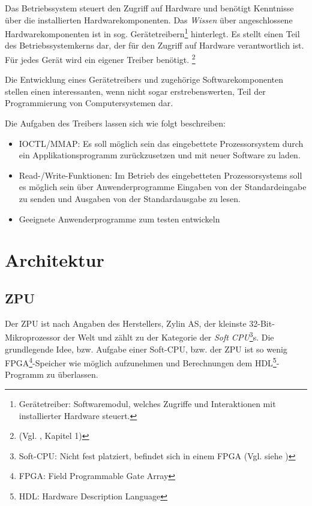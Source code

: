 \documentclass[11pt]{scrartcl}
\begin{document}
Das Betriebssystem steuert den Zugriff auf Hardware und benötigt Kenntnisse über die installierten Hardwarekomponenten. Das \textit{Wissen} über angeschlossene Hardwarekomponenten ist in sog. Gerätetreibern\footnote{Gerätetreiber: Softwaremodul, welches Zugriffe und Interaktionen mit installierter Hardware steuert.} hinterlegt. Es stellt einen Teil des Betriebssystemkerns dar, der für den Zugriff auf Hardware verantwortlich ist. Für jedes Gerät wird ein eigener Treiber benötigt. \footnote{(Vgl. \cite{ltp_book}, Kapitel 1)}

Die Entwicklung eines Gerätetreibers und zugehörige Softwarekomponenten stellen einen interessanten, wenn nicht sogar erstrebenswerten, Teil der Programmierung von Computersystemen dar.


Die Aufgaben des Treibers lassen sich wie folgt beschreiben:

\begin{itemize}

\item{IOCTL/MMAP: Es soll möglich sein das eingebettete Prozessorsystem durch ein Applikationsprogramm zurückzusetzen und mit neuer Software zu laden.}

\item{Read-/Write-Funktionen: Im Betrieb des eingebetteten Prozessorsystems soll es möglich sein über Anwenderprogramme Eingaben von der Standardeingabe zu senden und Ausgaben von der Standardausgabe zu lesen.}

\item{Geeignete Anwenderprogramme zum testen entwickeln}
\end{itemize}

\pagebreak

\section{Architektur}
 
\subsection{ZPU}

Der ZPU ist nach Angaben des Herstellers, Zylin AS, der kleinste 32-Bit-Mikroprozessor der Welt und zählt zu der Kategorie der \textit{Soft CPU}\footnote{Soft-CPU: Nicht fest platziert, befindet sich in einem FPGA (Vgl. siehe \cite{soft_cpu})}s. Die grundlegende Idee, bzw. Aufgabe einer Soft-CPU, bzw. der ZPU ist so wenig FPGA\footnote{FPGA: Field Programmable Gate Array}-Speicher wie möglich aufzunehmen und Berechnungen dem HDL\footnote{HDL: Hardware Description Language}-Programm zu überlassen.
\end{document}
